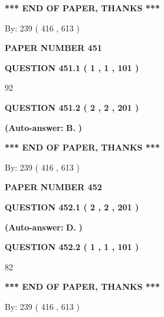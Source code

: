 \documentclass{ctexart}
\begin{document}
 
   
   
   
   
\vspace{1.0in} 
{\textbf{\large{ *** END OF PAPER, THANKS *** }}} 
   
   
\hspace{1.0in} By: 
 239 ( 416 ,  613 )
   
   
   
   
\newpage 
\setcounter{page}{ 
   451001 } 
   
   
 {\textbf{ \Large{ PAPER NUMBER  451  }}}
   
   
   
   
  
  
{\textbf{\large{QUESTION
451.1 
 ( 1 , 1 , 101 )
}}}

92
  
  
{\textbf{\large{QUESTION
451.2 
 ( 2 , 2 , 201 )
}}}
 
 
{\textbf{(Auto-answer:}}
{\textbf{\large{
B.}}}
{\textbf{)}}
 
 
   
   
   
   
\vspace{1.0in} 
{\textbf{\large{ *** END OF PAPER, THANKS *** }}} 
   
   
\hspace{1.0in} By: 
 239 ( 416 ,  613 )
   
   
   
   
\newpage 
\setcounter{page}{ 
   452001 } 
   
   
 {\textbf{ \Large{ PAPER NUMBER  452  }}}
   
   
   
   
  
  
{\textbf{\large{QUESTION
452.1 
 ( 2 , 2 , 201 )
}}}
 
 
{\textbf{(Auto-answer:}}
{\textbf{\large{
D.}}}
{\textbf{)}}
 
 
  
  
{\textbf{\large{QUESTION
452.2 
 ( 1 , 1 , 101 )
}}}

82
   
   
   
   
\vspace{1.0in} 
{\textbf{\large{ *** END OF PAPER, THANKS *** }}} 
   
   
\hspace{1.0in} By: 
 239 ( 416 ,  613 )
   
   
   
   
\newpage 
\setcounter{page}{ 
   453001 } 
   
\end{document}

